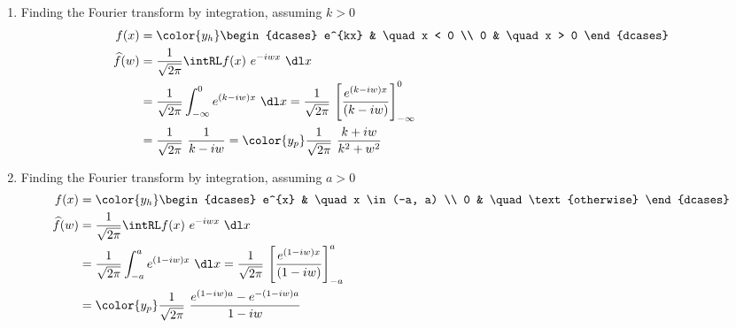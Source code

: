 \begin{enumerate}
    \item Finding the Fourier transform by integration, assuming $ k > 0 $
          \begin{align}
              f(x)           & = \color{y_h}\begin{dcases}
                                                e^{kx} & \quad x < 0 \\
                                                0      & \quad x > 0
                                            \end{dcases}                      \\
              \widehat{f}(w) & = \frac{1}{\sqrt{2\pi}} \intRL f(x)\ e^{-iwx}\ \dl x   \\
                             & = \frac{1}{\sqrt{2\pi}} \int_{-\infty}^{0} e^{(k-iw)x}
              \ \dl x
              = \frac{1}{\sqrt{2\pi}}\ \Bigg[ \frac{e^{(k-iw)x}}{(k-iw)}
              \Bigg]_{-\infty}^{0}                                                    \\
                             & = \frac{1}{\sqrt{2\pi}}\ \frac{1}{k-iw}
              = \color{y_p} \frac{1}{\sqrt{2\pi}}\ \frac{k + iw}{k^2 + w^2}
          \end{align}

    \item Finding the Fourier transform by integration, assuming $ a > 0 $
          \begin{align}
              f(x)           & = \color{y_h}\begin{dcases}
                                                e^{x} & \quad x \in (-a, a)    \\
                                                0     & \quad \text{otherwise}
                                            \end{dcases}            \\
              \widehat{f}(w) & = \frac{1}{\sqrt{2\pi}} \intRL f(x)\ e^{-iwx}\ \dl x   \\
                             & = \frac{1}{\sqrt{2\pi}} \int_{-a}^{a} e^{(1-iw)x}
              \ \dl x
              = \frac{1}{\sqrt{2\pi}}\ \Bigg[ \frac{e^{(1-iw)x}}{(1-iw)}
              \Bigg]_{-a}^{a}                                                         \\
                             & = \color{y_p} \frac{1}{\sqrt{2\pi}}\ \frac{e^{(1-iw)a}
                  - e^{-(1-iw)a}}{1-iw}
          \end{align}


\end{enumerate}
